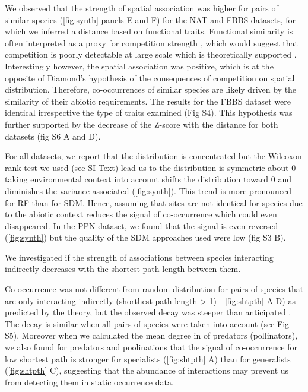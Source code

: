 We observed that the strength of spatial association was higher for
pairs of similar species (\ref{fig:synth} panels E and F) for the NAT
and FBBS datasets, for which we inferred a distance based on functional
traits. Functional similarity is often interpreted as a proxy for
competition strength \citep{Morales-Castilla2015}, which would suggest
that competition is poorly detectable at large scale which is
theoretically supported \citep{Araujo2014}. Interestingly however, the
spatial association was positive, which is at the opposite of Diamond's
hypothesis of the consequences of competition on spatial distribution.
Therefore, co-occurrences of similar species are likely driven by the
similarity of their abiotic requirements. The results for the FBBS
dataset were identical irrespective the type of traits examined (Fig
S4). This hypothesis was further supported by the decrease of the
Z-score with the distance for both datasets (fig S6 A and D).

For all datasets, we report that the distribution is concentrated but
the Wilcoxon rank test we used (see SI Text) lead us to the distribution
is symmetric about 0 taking environmental context into account shifts
the distribution toward 0 and diminishes the variance associated
(\ref{fig:synth}). This trend is more pronounced for RF than for SDM.
Hence, assuming that sites are not identical for species due to the
abiotic context reduces the signal of co-occurrence which could even
disappeared. In the PPN dataset, we found that the signal is even
reversed (\ref{fig:synth}) but the quality of the SDM approaches used
were low (fig S3 B).

We investigated if the strength of associations between species
interacting indirectly decreases with the shortest path length between
them.

Co-occurrence was not different from random distribution for pairs of
species that are only interacting indirectly (shorthest path length
­\textgreater{} 1) - \ref{fig:shtpth} A-D) as predicted by the theory,
but the observed decay was steeper than anticipated
\citep{Cazelles2016}. The decay is similar when all pairs of species
were taken into account (see Fig S5). Moreover when we calculated the
mean degree in of predators (pollinators), we also found for predators
and poolinations that the signal of co-occurrence for low shortest path
is stronger for specialists (\ref{fig:shtpth} A) than for generalists
(\ref{fig:shtpth} C), suggesting that the abundance of interactions may
prevent us from detecting them in static occurrence data.

